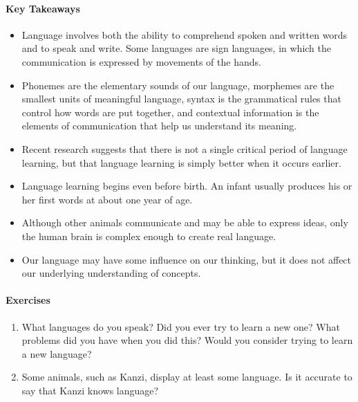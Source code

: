\documentclass[
]{krantz}
\providecommand{\tightlist}{%
  \setlength{\itemsep}{0pt}\setlength{\parskip}{0pt}}
\begin{document}
\hypertarget{key-takeaways-7}{%
\paragraph*{Key Takeaways}\label{key-takeaways-7}}

\begin{itemize}
\tightlist
\item
  Language involves both the ability to comprehend spoken and written words and to speak and write. Some languages are sign languages, in which the communication is expressed by movements of the hands.
\item
  Phonemes are the elementary sounds of our language, morphemes are the smallest units of meaningful language, syntax is the grammatical rules that control how words are put together, and contextual information is the elements of communication that help us understand its meaning.
\item
  Recent research suggests that there is not a single critical period of language learning, but that language learning is simply better when it occurs earlier.
\item
  Language learning begins even before birth. An infant usually produces his or her first words at about one year of age.
\item
  Although other animals communicate and may be able to express ideas, only the human brain is complex enough to create real language.
\item
  Our language may have some influence on our thinking, but it does not affect our underlying understanding of concepts.
\end{itemize}

\hypertarget{exercises-7}{%
\paragraph*{Exercises}\label{exercises-7}}

\begin{enumerate}
\def\labelenumi{\arabic{enumi}.}
\tightlist
\item
  What languages do you speak? Did you ever try to learn a new one? What problems did you have when you did this? Would you consider trying to learn a new language?
\item
  Some animals, such as Kanzi, display at least some language. Is it accurate to say that Kanzi knows language?
\end{enumerate}
\end{document}
